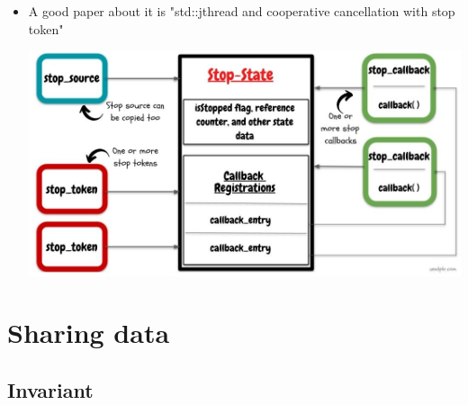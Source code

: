 \documentclass[a4paper,11pt,twoside]{book}
\begin{document}
\begin{itemize}
\begin{lstlisting}[frame=single, language=c++]
std::jthread sleepy_worker( [] (std::stop_token stoken) {
	for(int i=0; i < 10; i++) {
		std::this_thread::sleep_for(300ms);
		if(stoken.stop_requested()) {
			std::cout << "Sleepy worker is requested to stop\n";
			return;
		}
		std::cout << "Sleepy worker goes back to sleep\n";
	}
});

// A waiting worker thread, condition variable is awoken by the stop request.
std::jthread waiting_worker([] (std::stop_token stoken) {
	std::mutex mutex;
	std::unique_lock lock(mutex);
	std::condition_variable_any().wait(lock, stoken,
	[&stoken] { return false; });
	if(stoken.stop_requested()) {
		std::cout << "Waiting worker is requested to stop" << "\n";
		return;
	}
});

sleepy_worker.request_stop();
sleepy_worker.join();

// waiting_worker's destructor will call request_stop() 
//and join the thread automatically here
\end{lstlisting}

 
\item A good paper about it is "std::jthread and cooperative cancellation with stop token"
		
\includegraphics[width=0.85\linewidth]{pics/stop_token.jpg}
	
\end{itemize}

\section{Sharing data}

\subsection{Invariant}
\end{document}
